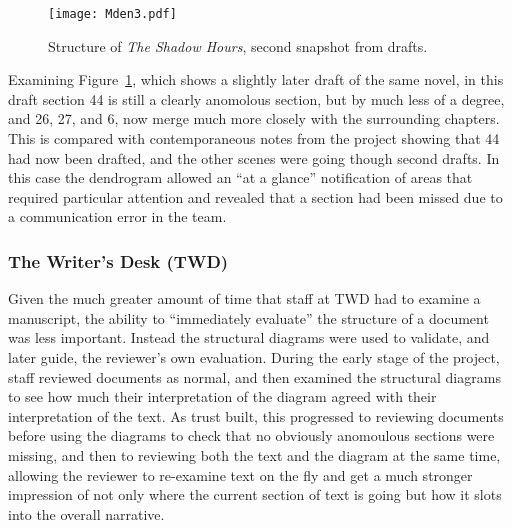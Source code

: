 \documentclass{article}
\begin{document}
\begin{figure}
\texttt{[image: Mden3.pdf]}
\caption{Structure of {\em The Shadow Hours}, second snapshot from drafts.}
\label{mden3}
\end{figure}

Examining Figure~\ref{mden3}, which shows a slightly later draft of the same novel, in this draft section 44 is still a clearly anomolous section, but by much less of a degree, and 26, 27, and 6, now merge much more closely with the surrounding chapters. This is compared with contemporaneous notes from the project showing that 44 had now been drafted, and the other scenes were going though second drafts.  In this case the dendrogram allowed an ``at a glance'' notification of areas that required particular attention and revealed that a section had been missed due to a communication error in the team. 

\subsubsection{The Writer's Desk (TWD)} 
Given the much greater amount of time that staff at TWD had to examine a manuscript, the ability to ``immediately evaluate'' the structure of a document was less important. Instead the structural diagrams were used to validate, and later guide, the reviewer's own evaluation.   During the early stage of the project, staff reviewed documents as normal, and then examined the structural diagrams to see how much their interpretation of the diagram agreed with their  interpretation of the text.  As trust built, this progressed to reviewing documents before using the diagrams to check that no obviously anomoulous sections were missing, and then to reviewing both the text and the diagram at the same time, allowing the reviewer to re-examine text on the fly and get a much stronger impression of not only where the current section of text is going but how it slots into the overall narrative. 
\end{document}

